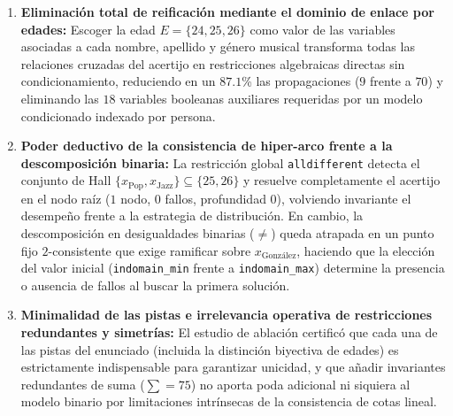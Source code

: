 \begin{enumerate}
    \item \textbf{Eliminación total de reificación mediante el dominio de enlace por edades:} Escoger la edad $E = \{24, 25, 26\}$ como valor de las variables asociadas a cada nombre, apellido y género musical transforma todas las relaciones cruzadas del acertijo en restricciones algebraicas directas sin condicionamiento, reduciendo en un $87.1$\% las propagaciones ($9$ frente a $70$) y eliminando las $18$ variables booleanas auxiliares requeridas por un modelo condicionado indexado por persona.
    \item \textbf{Poder deductivo de la consistencia de hiper-arco frente a la descomposición binaria:} La restricción global \texttt{alldifferent} detecta el conjunto de Hall $\{x_{\text{Pop}}, x_{\text{Jazz}}\} \subseteq \{25, 26\}$ y resuelve completamente el acertijo en el nodo raíz ($1$ nodo, $0$ fallos, profundidad $0$), volviendo invariante el desempeño frente a la estrategia de distribución. En cambio, la descomposición en desigualdades binarias ($\neq$) queda atrapada en un punto fijo $2$-consistente que exige ramificar sobre $x_{\text{González}}$, haciendo que la elección del valor inicial (\texttt{indomain\_min} frente a \texttt{indomain\_max}) determine la presencia o ausencia de fallos al buscar la primera solución.
    \item \textbf{Minimalidad de las pistas e irrelevancia operativa de restricciones redundantes y simetrías:} El estudio de ablación certificó que cada una de las pistas del enunciado (incluida la distinción biyectiva de edades) es estrictamente indispensable para garantizar unicidad, y que añadir invariantes redundantes de suma ($\sum = 75$) no aporta poda adicional ni siquiera al modelo binario por limitaciones intrínsecas de la consistencia de cotas lineal.
\end{enumerate}
